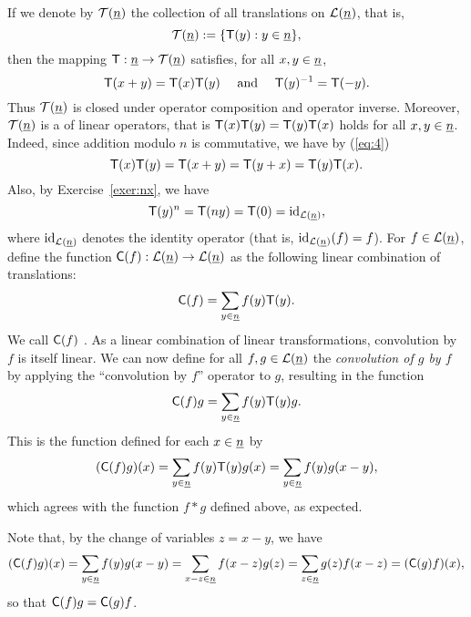 If we denote by $\mathcal T(\underline{n})$ the collection of all translations on $\mathcal L(\underline{n})$, that is,
\[
\mathcal T(\underline{n}):= \{\mathsf{T}(y) : y \in \underline{n}\},
\]
then the mapping $\mathsf{T} : \underline{n} \to \mathcal T(\underline{n})$ satisfies, for all
$x, y \in \underline{n}$,
\begin{equation}
  \label{eq:4}
\mathsf{T}(x+y) = \mathsf{T}(x)\mathsf{T}(y) 
\quad  \text{ and } \quad
\mathsf{T}(y)^{-1} = \mathsf{T}(-y).
\end{equation}
Thus $\mathcal T(\underline{n})$ is closed under operator composition and operator inverse.
Moreover, $\mathcal T(\underline{n})$ is a 
 of linear operators, that is 
$\mathsf{T}(x)\mathsf{T}(y)  =  \mathsf{T}(y)\mathsf{T}(x)$ holds for all
$x, y \in \underline{n}$. Indeed,
since addition modulo $n$ is commutative, we have by (\ref{eq:4})
\[
\mathsf{T}(x)\mathsf{T}(y) = \mathsf{T}(x+y) = \mathsf{T}(y+x) = \mathsf{T}(y)\mathsf{T}(x).
\]
Also, by Exercise~\ref{exer:nx}, we have
\[
\mathsf{T}(y)^n = \mathsf{T}(ny) = \mathsf{T}(0) = \operatorname{id}_{\mathcal L(\underline{n})},
\]
where $\operatorname{id}_{\mathcal L(\underline{n})}$ denotes the identity operator (that is, $\operatorname{id}_{\mathcal L(\underline{n})}(f) = f$).
For $f \in \mathcal L(\underline{n})$, define the function $\mathsf{C}(f): \mathcal L(\underline{n}) \to \mathcal L(\underline{n})$ as the
following linear combination of translations:
\[
\mathsf{C}(f) = \sum_{y\in \underline{n}} f(y) \mathsf{T}(y).
\]
We call $\mathsf{C}(f)$ . As a linear combination 
of %
linear transformations, convolution 
by $f$ is itself linear.
We can now define for all
$f, g\in \mathcal L(\underline{n})$ the \emph{convolution of $g$ by $f$} by applying
the ``convolution by $f$'' operator to $g$, resulting in the function
\[
\mathsf{C}(f) g = \sum_{y\in \underline{n}} f(y) \mathsf{T}(y) g.
\]
This is the function defined for each $x\in \underline{n}$ by 
\[
(\mathsf{C}(f) g)(x) = \sum_{y\in \underline{n}} f(y) \mathsf{T}(y) g(x)
= \sum_{y\in \underline{n}} f(y) g(x-y),
\]
which agrees with the function $f\ast g$ defined above, as expected.

Note that, by the change of variables $z = x-y$, we have
\[
(\mathsf{C}(f) g)(x) = \sum_{y\in \underline{n}} f(y) g(x-y)
= \sum_{x-z\in \underline{n}} f(x-z) g(z)
= \sum_{z\in \underline{n}} g(z) f(x-z) = (\mathsf{C}(g) f)(x),
\]
so that $\mathsf{C}(f)g = \mathsf{C}(g)f$.


